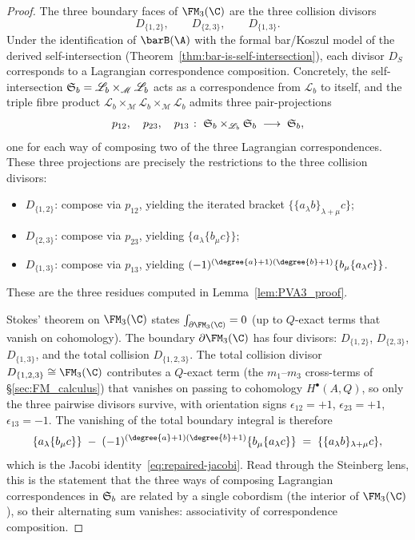 \begin{proof}
The three boundary faces of $\FM_3(\C)$ are the three collision divisors
\[
D_{\{1,2\}},\qquad D_{\{2,3\}},\qquad D_{\{1,3\}}.
\]
Under the identification of $\barB(\A)$ with the formal
bar/Koszul model of the derived self-intersection
\textup{(}Theorem~\textup{\ref{thm:bar-is-self-intersection}}\textup{)},
each divisor $D_S$
corresponds to a Lagrangian correspondence composition. Concretely, the
self-intersection $\mathfrak{S}_b = \mathscr{L}_b \times_{\mathscr{M}}
\mathscr{L}_b$ acts as a correspondence from $\mathscr{L}_b$ to itself,
and the triple fibre product
$\mathscr{L}_b \times_{\mathscr{M}} \mathscr{L}_b \times_{\mathscr{M}}
\mathscr{L}_b$ admits three pair-projections
\[
p_{12},\quad p_{23},\quad p_{13}
\;\colon\;
\mathfrak{S}_b \times_{\mathscr{L}_b} \mathfrak{S}_b
\;\longrightarrow\;
\mathfrak{S}_b,
\]
one for each way of composing two of the three Lagrangian
correspondences. These three projections are precisely the
restrictions to the three collision divisors:
\begin{itemize}
\item $D_{\{1,2\}}$: compose via $p_{12}$, yielding the iterated bracket
 $\{\{a_\lambda b\}_{\lambda+\mu} c\}$;
\item $D_{\{2,3\}}$: compose via $p_{23}$, yielding
 $\{a_\lambda \{b_\mu c\}\}$;
\item $D_{\{1,3\}}$: compose via $p_{13}$, yielding
 $(-1)^{(\degree{a}+1)(\degree{b}+1)}\{b_\mu \{a_\lambda c\}\}$.
\end{itemize}
These are the three residues computed in
Lemma~\ref{lem:PVA3_proof}.

Stokes' theorem on $\FM_3(\C)$ states
$\int_{\partial\FM_3(\C)} = 0$ (up to $Q$-exact terms that vanish on
cohomology). The boundary $\partial\FM_3(\C)$ has four divisors:
$D_{\{1,2\}}$, $D_{\{2,3\}}$, $D_{\{1,3\}}$, and the total collision
$D_{\{1,2,3\}}$. The total collision divisor $D_{\{1,2,3\}} \cong \FM_3(\C)$
contributes a $Q$-exact term (the $m_1$--$m_3$ cross-terms of
\S\ref{sec:FM_calculus}) that vanishes on passing to cohomology $H^\bullet(A,Q)$,
so only the three pairwise divisors survive, with orientation signs
$\epsilon_{12}=+1$, $\epsilon_{23}=+1$, $\epsilon_{13}=-1$.
The vanishing of the total boundary integral is therefore
\[
\{a_\lambda\{b_\mu c\}\}
\;-\;
(-1)^{(\degree{a}+1)(\degree{b}+1)}\{b_\mu\{a_\lambda c\}\}
\;=\;
\{\{a_\lambda b\}_{\lambda+\mu}c\},
\]
which is the Jacobi identity~\eqref{eq:repaired-jacobi}. Read through
the Steinberg lens, this is the statement that the three ways of
composing Lagrangian correspondences in $\mathfrak{S}_b$ are
related by a single cobordism (the interior of $\FM_3(\C)$), so their
alternating sum vanishes: associativity of correspondence composition.


\end{proof}
